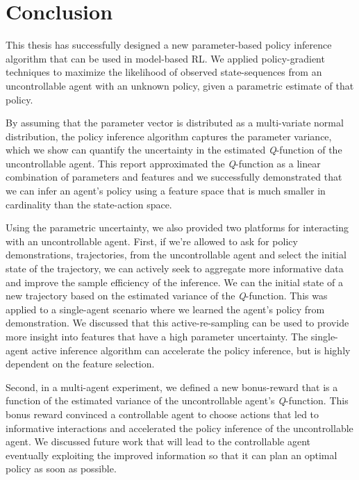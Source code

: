 \chapter{Conclusion}\label{chapt:conclusion}

This thesis has successfully designed a new parameter-based policy inference algorithm that can be used in model-based
\ac{RL}. We applied policy-gradient techniques to maximize the likelihood of observed state-sequences from an
uncontrollable agent with an unknown policy, given a parametric estimate of that policy.

By assuming that the parameter vector is distributed as a multi-variate normal distribution, the policy inference
algorithm captures the parameter variance, which we show can quantify the uncertainty in the estimated \emph{Q}-function
of the uncontrollable agent. This report approximated the \emph{Q}-function as a linear combination of parameters and
features and we successfully demonstrated that we can infer an agent's policy using a feature space that is much smaller
in cardinality than the state-action space.


Using the parametric uncertainty, we also provided two platforms for interacting with an uncontrollable agent. First, if
we're allowed to ask for policy demonstrations, trajectories, from the uncontrollable agent and select the initial state
of the trajectory, we can actively seek to aggregate more informative data and improve the sample efficiency of the
inference. We  can the initial state of a new trajectory based on the estimated variance of the \emph{Q}-function. This
was applied to a single-agent scenario where we learned the agent's policy from demonstration. We discussed that this
active-re-sampling can be used to provide more insight into features that have a high parameter uncertainty. The
single-agent active inference algorithm can accelerate the policy inference, but is highly dependent on the feature
selection.

Second, in a multi-agent experiment, we defined a new bonus-reward that is a function of the estimated variance of the
uncontrollable agent's \emph{Q}-function. This bonus reward convinced a controllable agent to choose actions that led to
informative interactions and accelerated the policy inference of the uncontrollable agent. We discussed future work that
will lead to the controllable agent eventually exploiting the improved information so that it can plan an optimal policy
as soon as possible.

